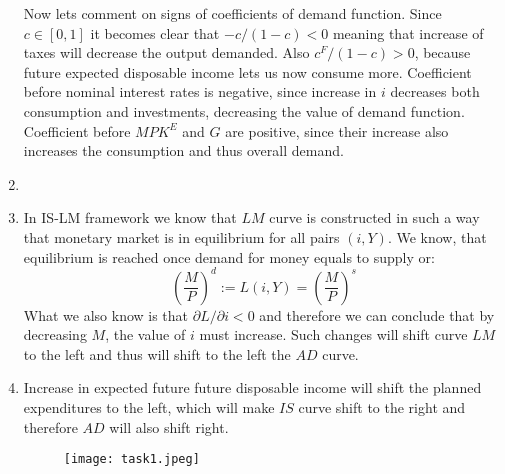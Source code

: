 \documentclass[11pt, oneside]{article}
\begin{document}
\begin{enumerate}[(1)]
	 Now lets comment on signs of coefficients of demand function. Since $ c \in [0, 1] $ it becomes clear that $ -c/(1-c) < 0 $ meaning that increase of taxes will decrease the output demanded. Also $ c^{F}/(1-c) >0 $, because future expected disposable income lets us now consume more. Coefficient before nominal interest rates is negative, since increase in $ i $ decreases both consumption and investments, decreasing the value of demand function. Coefficient before $ MPK^{E} $ and $ G $ are positive, since their increase also increases the consumption and thus overall demand.
	 \item 
	 \item In IS-LM framework we know that $ LM $ curve is constructed in such a way that monetary market is in equilibrium for all pairs $ (i, Y) $. We know, that equilibrium is reached once demand for money equals to supply or:
	 \[
	 \left( \frac{M}{P}\right)^{d} := L(i, Y)  = \left(\frac{M}{P}\right)^{s}
	 \]
	 What we also know is that $ \partial L/\partial i < 0 $ and therefore we can conclude that by decreasing $ M $, the value of $ i $ must increase. Such changes will shift curve $ LM $ to the left and thus will shift to the left the $ AD $ curve.
	 \item Increase in expected future future disposable income will shift the planned expenditures to the left, which will make $ IS $ curve shift to the right and therefore $ AD $ will also shift right.
	 \begin{figure}[!hbtp]
	 	\centering
	 	\texttt{[image: task1.jpeg]}
	 \end{figure}
\end{enumerate}
\end{document}
